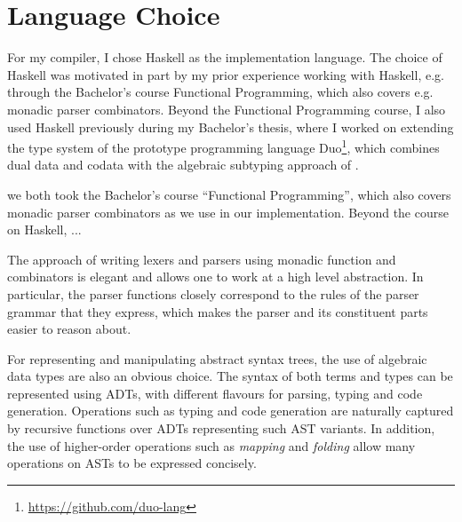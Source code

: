 \section{Language Choice}

For my compiler, I chose Haskell as the implementation language. The choice
of Haskell was motivated in part by my prior experience working with Haskell,
e.g. through the Bachelor's course Functional Programming, which also covers e.g.
monadic parser combinators.
Beyond the Functional Programming course, I also used Haskell previously during
my Bachelor's thesis, where I worked on extending the type system of the prototype
programming language Duo\footnote{\url{https://github.com/duo-lang}}, which
combines dual data and codata with the algebraic subtyping approach of
\citet{Dolan2017}.

we both took the Bachelor's course ``Functional Programming'', which also covers
monadic parser combinators as we use in our implementation.
Beyond the course on Haskell, ...

The approach of writing lexers and parsers using monadic function and
combinators is elegant and allows one to work at a high level abstraction.
In particular, the parser functions closely correspond to the rules of the
parser grammar that they express, which makes the parser and its constituent
parts easier to reason about.

For representing and manipulating abstract syntax trees, the use of algebraic
data types are also an obvious choice. The syntax of both terms and types can be
represented using ADTs, with different flavours for parsing, typing and code
generation. Operations such as typing and code generation are naturally captured
by recursive functions over ADTs representing such AST variants.
In addition, the use of higher-order operations such as \emph{mapping} and
\emph{folding} allow many operations on ASTs to be expressed concisely.
